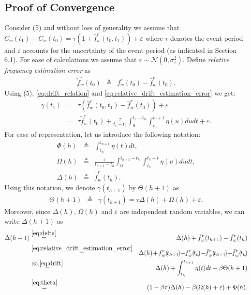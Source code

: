 \documentclass[10pt,journal,compsoc]{IEEEtran}
\begin{document}
\subsection{Proof of Convergence}
Consider (5) and without loss of 
generality we assume that 
$C_{w}(t_{1})-C_{w}(t_{0})=\tau(1+\bar{f}_{w}^{r}(t_0,t_1))+\varepsilon$
where $\tau$ denotes the event period and $\varepsilon$ accounts for the 
uncertainty of the event period (as 
indicated in Section 6.1). For ease of 
calculations we assume that $\varepsilon\sim\mathcal{N}(0,\sigma^2_{\tau})$. 
Define \emph{relative frequency estimation error} as
\begin{eqnarray}
\tilde{f}_{w}^{r}(t_0) & \triangleq & 
f_{w}^{r}(t_0)-\hat{f}_{w}^{r}(t_0).\label{eq:relative_drift_estimation_error}
\end{eqnarray}
Using (5), \eqref{eq:drift_relation} and 
\eqref{eq:relative_drift_estimation_error} we get:
\begin{eqnarray}
\gamma(t_1) & = & 
\tau(\bar{f}_{w}^{r}(t_0,t_1)-\hat{f}_{w}^{r}(t_0))+ \varepsilon \nonumber \\
&=&  
\tau\tilde{f}_{w}^{r}(t_0)+\frac{\tau}{t_1-t_0}\int_{0}^{t_1-t_0}\!\!\!\int_{t_{0}}^{t_0+t}\!\!\!\!\!\!\!\!\!\!\!\eta(u)dudt
+ \varepsilon.
\end{eqnarray}
For ease of representation, let us introduce the following 
notation:
\begin{eqnarray}
\Phi(h) &\triangleq& \int_{t_h}^{t_{h+1}}\eta(t)dt, \\
\Omega(h) &\triangleq& 
\frac{\tau}{t_{h+1}-t_h}\int_{0}^{t_{h+1}-t_h}\int_{t_{h}}^{t_h+t}\eta(u)dudt,
\\
\Delta(h) &\triangleq& \tilde{f}_{w}^{r}(t_{h}). \label{eq:delta}
\end{eqnarray}
Using this notation, we denote $\gamma(t_{h+1})$ by $\Theta(h+1)$ as
\begin{eqnarray}
\Theta(h+1) &\triangleq& \gamma(t_{h+1})=\tau\Delta(h) + \Omega(h)+\varepsilon. 
\label{eq:theta}
\end{eqnarray}
Moreover, since $\Delta(h)$, $\Omega(h)$ and $\varepsilon$ are 
independent random variables, we can write $\Delta(h+1)$ as
\begin{eqnarray}
\Delta(h+1) &\overset{\eqref{eq:delta}}{=}& 
\Delta(h)+\tilde{f}_{w}^{r}(t_{h+1})-\tilde{f}_{w}^{r}(t_{h}) \nonumber \\
&\overset{\eqref{eq:relative_drift_estimation_error}}{=}& \Delta(h)
\!+\!f_w^r(\!t_{h+1}\!)\!-\!\!f_w^r(\!t_{h}\!) \!-\!\!\hat{f}_w^r(\!t_{h+1}\!)\!+\!\!\hat{f}_w^r(\!t_{h}\!)
\nonumber\\
&\overset{(6),\eqref{eq:drift}}{=}& 
\Delta(h)+\int_{t_h}^{t_{h+1}}\eta(t)dt-\beta\Theta(h+1) \nonumber \\
&\overset{\eqref{eq:theta}}{=}& 
(1-\beta\tau)\Delta(h)-\beta(\Omega(h)+\varepsilon) +\Phi(h). 
\label{eq:delta_recursive}
\end{eqnarray} 
\end{document}
